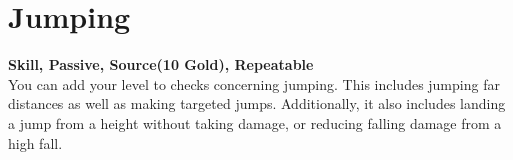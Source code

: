 \section{Jumping}\label{sec:jumping}
\textbf{Skill, Passive, Source(10 Gold), Repeatable}\\
You can add your level to checks concerning jumping. This includes jumping far distances as well as making targeted jumps. Additionally, it also includes landing a jump from a height without taking damage, or reducing falling damage from a high fall.